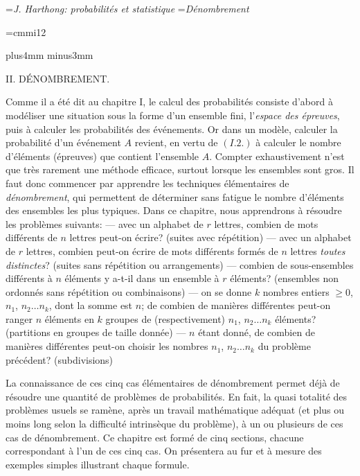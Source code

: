 


\auteurcourant={\sl J. Harthong: probabilit\'es et statistique}
\titrecourant={\sl D\'enombrement}

\font\twelvemi=cmmi12 
\def\struta{\vrule depth2.4pt width0pt} 
\def\strutb{\vrule depth4.8pt width0pt} 
\def\strutc{\vrule depth3.6pt width0pt} 

 
\null\vskip10mm plus4mm minus3mm 
 
\centerline{\tit II. D\'ENOMBREMENT.} 
\vskip10mm 
 
Comme il a \'et\'e dit au chapitre I, le calcul des probabilit\'es  
consiste d'abord \`a mod\'eliser une situation sous la forme d'un 
ensemble fini,  l'{\it espace des \'epreuves}, puis \`a calculer les 
probabilit\'es des \'ev\'enements. Or dans un mod\`ele, calculer la 
probabilit\'e d'un \'ev\'enement $A$ revient, en vertu de $(I.2.)$ \`a 
calculer le nombre d'\'el\'ements (\'epreuves) que contient l'ensemble 
$A$. Compter exhaustivement n'est que tr\`es rarement une m\'ethode 
efficace,  surtout lorsque les ensembles sont gros. Il faut donc 
commencer par apprendre les techniques \'el\'ementaires de {\it 
d\'enombrement}, qui permettent de d\'eterminer sans fatigue le 
nombre d'\'el\'ements des ensembles les plus ty\-pi\-ques. Dans ce 
chapitre, nous apprendrons \`a r\'esoudre les probl\`emes sui\-vants:  
\smallskip 
--- avec un alphabet de $r$ lettres, combien de mots diff\'erents de  
$n$ lettres peut-on \'ecrire? (suites avec r\'ep\'etition) 
\smallskip 
--- avec un alphabet de $r$ lettres, combien peut-on \'ecrire de mots  
diff\'erents form\'es de $n$ lettres {\it toutes distinctes}? (suites  
sans r\'ep\'etition ou arrangements)  
\smallskip 
--- combien de sous-ensembles diff\'erents \`a $n$ \'el\'ements y a-t-il 
dans un ensemble \`a  $r$  \'el\'ements? (ensembles non ordonn\'es sans 
r\'ep\'etition ou combinaisons) 
\smallskip 
--- on se donne $k$ nombres entiers $\geq 0$, $n_1$, $n_2 \ldots n_k$, 
dont la somme est $n$; de combien de mani\`eres diff\'erentes peut-on  
ranger $n$ \'el\'ements en $k$ groupes de (respectivement) $n_1$, $n_2 
\ldots n_k$ \'el\'ements? (partitions en groupes de taille donn\'ee) 
\smallskip 
--- $n$ \'etant donn\'e, de combien de mani\`eres diff\'erentes peut-on  
choisir les nombres $n_1$, $n_2 \ldots n_k$ du probl\`eme pr\'ec\'edent? 
(subdivisions) 
 
\medskip 
La connaissance de ces cinq cas \'el\'ementaires de d\'enombrement  
permet d\'ej\`a de r\'esoudre une quantit\'e de probl\`emes de 
probabilit\'es. En fait, la quasi totalit\'e des probl\`emes usuels se 
ram\`ene, apr\`es un travail math\'ematique ad\'equat (et plus ou moins 
long selon  la difficult\'e intrins\`eque du probl\`eme), \`a un ou 
plusieurs de ces cas de d\'enombrement.  
\medskip 
Ce chapitre est form\'e de cinq sections, chacune correspondant \`a 
l'un de ces cinq cas. On pr\'esentera au fur et \`a mesure des exemples 
simples illustrant  chaque formule. 
 
